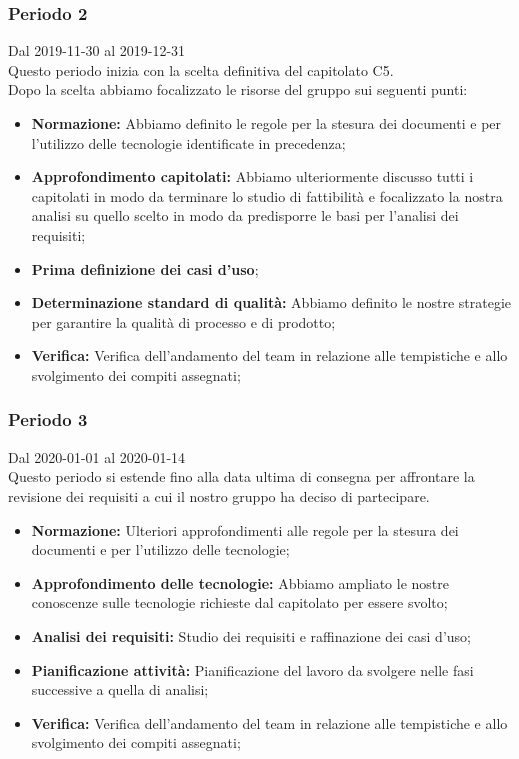 \subsubsection{Periodo 2} 
Dal 2019-11-30 al 2019-12-31\\
Questo periodo inizia con la scelta definitiva del capitolato C5.\\
Dopo la scelta abbiamo focalizzato le risorse del gruppo sui seguenti punti:
\begin{itemize}
	\item \textbf{Normazione: }Abbiamo definito le regole per la stesura dei documenti e per l'utilizzo delle tecnologie identificate in precedenza;
	\item \textbf{Approfondimento capitolati: }Abbiamo ulteriormente discusso tutti i capitolati in modo da terminare lo studio di fattibilità e focalizzato la nostra analisi su quello scelto in modo da predisporre le basi per l'analisi dei requisiti;
	\item \textbf{Prima definizione dei casi d'uso};
	\item \textbf{Determinazione standard di qualità: }Abbiamo definito le nostre strategie per garantire la qualità di processo e di prodotto;
	\item \textbf{Verifica: }Verifica dell'andamento del team in relazione alle tempistiche e allo svolgimento dei compiti assegnati;
\end{itemize}
\subsubsection{Periodo 3}
 Dal 2020-01-01 al 2020-01-14\\
 Questo periodo si estende fino alla data ultima di consegna per affrontare la revisione dei requisiti a cui il nostro gruppo ha deciso di partecipare.\\
 \begin{itemize}
	\item \textbf{Normazione: }Ulteriori approfondimenti alle regole per la stesura dei documenti e per l'utilizzo delle tecnologie;
	\item \textbf{Approfondimento delle tecnologie: }Abbiamo ampliato le nostre conoscenze sulle tecnologie richieste dal capitolato per essere svolto;
	\item \textbf{Analisi dei requisiti: } Studio dei requisiti e raffinazione dei casi d'uso;
	\item \textbf{Pianificazione attività: }Pianificazione del lavoro da svolgere nelle fasi successive a quella di analisi;
	\item \textbf{Verifica: }Verifica dell'andamento del team in relazione alle tempistiche e allo svolgimento dei compiti assegnati;

 \end{itemize}
